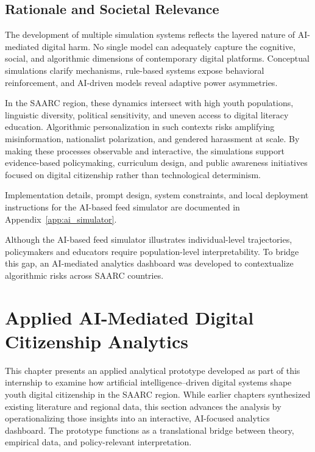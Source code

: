 \documentclass[12pt,a4paper]{report}
\begin{document}
\subsection{Rationale and Societal Relevance}

The development of multiple simulation systems reflects the layered nature of AI-mediated digital harm. No single model can adequately capture the cognitive, social, and algorithmic dimensions of contemporary digital platforms. Conceptual simulations clarify mechanisms, rule-based systems expose behavioral reinforcement, and AI-driven models reveal adaptive power asymmetries.

In the SAARC region, these dynamics intersect with high youth populations, linguistic diversity, political sensitivity, and uneven access to digital literacy education. Algorithmic personalization in such contexts risks amplifying misinformation, nationalist polarization, and gendered harassment at scale. By making these processes observable and interactive, the simulations support evidence-based policymaking, curriculum design, and public awareness initiatives focused on digital citizenship rather than technological determinism.

Implementation details, prompt design, system constraints, and local deployment instructions for the AI-based feed simulator are documented in Appendix~\ref{app:ai_simulator}.

Although the AI-based feed simulator illustrates individual-level trajectories, policymakers and educators require population-level interpretability. To bridge this gap, an AI-mediated analytics dashboard was developed to contextualize algorithmic risks across SAARC countries.



\section{Applied AI-Mediated Digital Citizenship Analytics}

This chapter presents an applied analytical prototype developed as part of this internship to examine how artificial intelligence–driven digital systems shape youth digital citizenship in the SAARC region. While earlier chapters synthesized existing literature and regional data, this section advances the analysis by operationalizing those insights into an interactive, AI-focused analytics dashboard. The prototype functions as a translational bridge between theory, empirical data, and policy-relevant interpretation.
\end{document}
